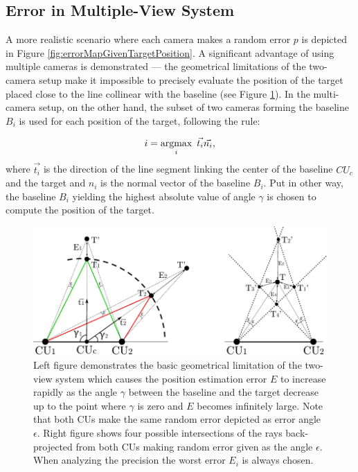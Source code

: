 \subsection{Error in Multiple-View System}

A more realistic scenario where each camera makes a random error $p$ is depicted in Figure \ref{fig:errorMapGivenTargetPosition}. A significant advantage of using multiple cameras is demonstrated --- the geometrical limitations of the two-camera setup make it impossible to precisely evaluate the position of the target placed close to the line collinear with the baseline (see Figure \ref{fig:target_base_geometry_and_worst_error}). In the multi-camera setup, on the other hand, the subset of two cameras forming the baseline $B_{i}$ is used for each position of the target, following the rule: 

\begin{align}
i = \argmax_{i}\ \vec{t_{i}}\vec{n_{i}},
\end{align}
where $\vec{t_{i}}$ is the direction of the line segment linking the center of the baseline $CU_{c}$ and the target and $n_{i}$ is the normal vector of the baseline $B_{i}$. Put in other way, the baseline $B_{i}$ yielding the highest absolute value of angle $\gamma$ is chosen to compute the position of the target.

\begin{figure}[htb]\centering
	\centering
	\includegraphics[width=0.75\linewidth]{fig/target_base_geometry.pdf}
	\caption{Left figure demonstrates the basic geometrical limitation of the two-view system which causes the position estimation error $E$ to increase rapidly as the angle $\gamma$ between the baseline and the target decrease up to the point where $\gamma$ is zero and $E$ becomes infinitely large. Note that both CUs make the same random error depicted as error angle $\epsilon$. Right figure shows four possible intersections of the rays back-projected from both CUs making random error given as the angle $\epsilon$. When analyzing the precision the worst error $E_{i}$ is always chosen.}
	\label{fig:target_base_geometry_and_worst_error}
\end{figure}

